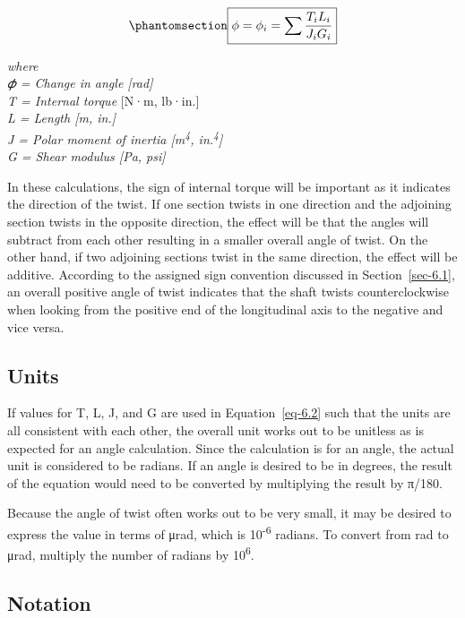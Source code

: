 \documentclass[
  letterpaper,
  DIV=11,
  numbers=noendperiod]{scrreprt}
\theoremstyle{definition}
\theoremstyle{remark}
\begin{document}
\begin{equation}\phantomsection\label{eq-6.2}{
\boxed{\phi=\phi_i=\sum \frac{T_i L_i}{J_i G_i}}
}\end{equation}

\emph{where}\\
\emph{𝜙 = Change in angle {[}rad{]}}\\
\emph{T = Internal torque} {[}N·m, lb·in.{]}\\
\emph{L = Length {[}m, in.{]}}\\
\emph{J = Polar moment of inertia {[}m\textsuperscript{4},
in.\textsuperscript{4}{]}}\\
\emph{G = Shear modulus {[}Pa, psi{]}}

In these calculations, the sign of internal torque will be important as
it indicates the direction of the twist. If one section twists in one
direction and the adjoining section twists in the opposite direction,
the effect will be that the angles will subtract from each other
resulting in a smaller overall angle of twist. On the other hand, if two
adjoining sections twist in the same direction, the effect will be
additive. According to the assigned sign convention discussed in
Section~\ref{sec-6.1}, an overall positive angle of twist indicates that
the shaft twists counterclockwise when looking from the positive end of
the longitudinal axis to the negative and vice versa.

\subsection{Units}\label{units}

If values for T, L, J, and G are used in Equation~\ref{eq-6.2} such that
the units are all consistent with each other, the overall unit works out
to be unitless as is expected for an angle calculation. Since the
calculation is for an angle, the actual unit is considered to be
radians. If an angle is desired to be in degrees, the result of the
equation would need to be converted by multiplying the result by π/180.

Because the angle of twist often works out to be very small, it may be
desired to express the value in terms of μrad, which is
10\textsuperscript{-6} radians. To convert from rad to μrad, multiply
the number of radians by 10\textsuperscript{6}.

\subsection{Notation}\label{notation}
\end{document}
